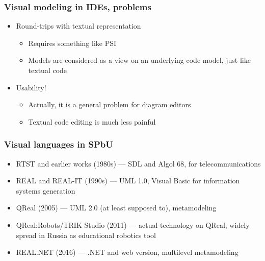 \documentclass{slides-style}
\begin{document}
    \begin{frame}
        \frametitle{Visual modeling in IDEs, problems}
        \begin{itemize}
            \item Round-trips with textual representation
            \begin{itemize}
                \item Requires something like PSI
                \item Models are considered as a view on an underlying code model, just like textual code
            \end{itemize}
            \item Usability!
            \begin{itemize}
                \item Actually, it is a general problem for diagram editors
                \item Textual code editing is much less painful
            \end{itemize}
        \end{itemize}
    \end{frame}

    \begin{frame}
        \frametitle{Visual languages in SPbU}
        \begin{itemize}
            \item RTST and earlier works (1980s) --- SDL and Algol 68, for telecommunications
            \item REAL and REAL-IT (1990s) --- UML 1.0, Visual Basic for information systems generation
            \item QReal (2005) --- UML 2.0 (at least supposed to), metamodeling
            \item QReal:Robots/TRIK Studio (2011) --- actual technology on QReal, widely spread in Russia as educational robotics tool
            \item REAL.NET (2016) --- .NET and web version, multilevel metamodeling
        \end{itemize}
    \end{frame}
\end{document}
